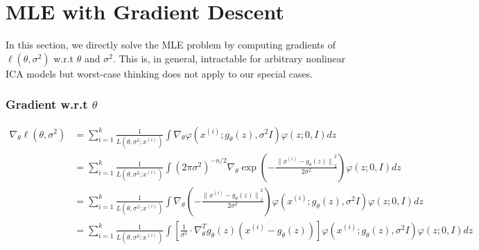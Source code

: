 \section{MLE with Gradient Descent}
In this section, we directly solve the MLE problem by computing gradients of $\ell(\theta, \sigma^{2})$ w.r.t $\theta$ and $\sigma^{2}$. This is, in general, intractable for arbitrary nonlinear ICA models but worst-case thinking does not apply to our special cases.

\subsubsection*{Gradient w.r.t $\theta$}
\begin{equation*}
\begin{aligned}
\nabla_{\theta} \ell(\theta, \sigma^{2}) &= \sum_{i=1}^{k} \frac{1}{L \left(\theta, \sigma^{2}; x^{(i)} \right)} \int \nabla_{\theta} \varphi\left(x^{(i)} ; g_{\theta}(z), \sigma^{2} I\right) \varphi(z ; 0, I) dz \\
&= \sum_{i=1}^{k} \frac{1}{L \left(\theta, \sigma^{2}; x^{(i)} \right)} \int \left(2\pi\sigma^{2}\right)^{-n/2} \nabla_{\theta} \exp \left(-\frac{{\lVert x^{(i)} - g_{\theta}(z) \rVert}_{2}^{2}}{2\sigma^{2}}\right) \varphi(z ; 0, I) dz \\
&= \sum_{i=1}^{k} \frac{1}{L \left(\theta, \sigma^{2}; x^{(i)} \right)} \int \nabla_{\theta} \left(-\frac{{\lVert x^{(i)} - g_{\theta}(z) \rVert}_{2}^{2}}{2\sigma^{2}}\right) \varphi\left(x^{(i)} ; g_{\theta}(z), \sigma^{2} I\right) \varphi(z ; 0, I) dz \\
&= \sum_{i=1}^{k} \frac{1}{L \left(\theta, \sigma^{2}; x^{(i)} \right)} \int \left[\frac{1}{\sigma^{2}} \cdot{\nabla_{\theta}^{T} g_{\theta}(z) \left(x^{(i)} - g_{\theta}(z)\right)}\right] \varphi\left(x^{(i)} ; g_{\theta}(z), \sigma^{2} I\right) \varphi(z ; 0, I) dz \\
\end{aligned}
\end{equation*}

